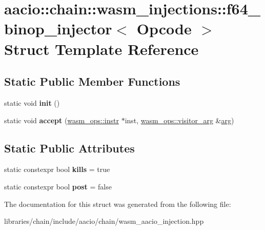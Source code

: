 \hypertarget{structaacio_1_1chain_1_1wasm__injections_1_1f64__binop__injector}{}\section{aacio\+:\+:chain\+:\+:wasm\+\_\+injections\+:\+:f64\+\_\+binop\+\_\+injector$<$ Opcode $>$ Struct Template Reference}
\label{structaacio_1_1chain_1_1wasm__injections_1_1f64__binop__injector}
\subsection*{Static Public Member Functions}
\begin{DoxyCompactItemize}
\item 
\mbox{\label{structaacio_1_1chain_1_1wasm__injections_1_1f64__binop__injector_a31cb02408226d5a1f46164572e910807}} 
static void {\bfseries init} ()
\item 
\mbox{\label{structaacio_1_1chain_1_1wasm__injections_1_1f64__binop__injector_ac50d1b2df44f7888b6e3fdc2185a1bf6}} 
static void {\bfseries accept} (\mbox{\hyperlink{structaacio_1_1chain_1_1wasm__ops_1_1instr}{wasm\+\_\+ops\+::instr}} $\ast$inst, \mbox{\hyperlink{structaacio_1_1chain_1_1wasm__ops_1_1visitor__arg}{wasm\+\_\+ops\+::visitor\+\_\+arg}} \&\mbox{\hyperlink{unionarg}{arg}})
\end{DoxyCompactItemize}
\subsection*{Static Public Attributes}
\begin{DoxyCompactItemize}
\item 
\mbox{\label{structaacio_1_1chain_1_1wasm__injections_1_1f64__binop__injector_a1afb0b5828b79b5d4abb6fe120a91d02}} 
static constexpr bool {\bfseries kills} = true
\item 
\mbox{\label{structaacio_1_1chain_1_1wasm__injections_1_1f64__binop__injector_a42f85076b0bf102b0eb85d8cbea7a5f4}} 
static constexpr bool {\bfseries post} = false
\end{DoxyCompactItemize}


The documentation for this struct was generated from the following file\+:\begin{DoxyCompactItemize}
\item 
libraries/chain/include/aacio/chain/wasm\+\_\+aacio\+\_\+injection.\+hpp\end{DoxyCompactItemize}

